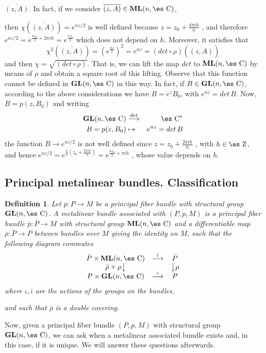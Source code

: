 \documentclass[12pt]{article}
\theoremstyle{plain}
\newtheorem{definition}{Definition}
\def\beann{\begin{eqnarray*}}
\def\eeann{\end{eqnarray*}}
\def\dst{\(}
\def\mapping#1{\mathrel{\mathop{\longrightarrow}\limits^{#1}}}
\def\GL{{\bf GL}(n,\Complex )}
\def\ML{{\bf ML}(n,\Complex )}
\def\Zahl{\mbox{\es Z}}
\def\Complex{\mbox{\es C}}
\begin{document}
$\overline{(z,A)}$.  In fact, if we consider $\overline{(z,A)} \in \ML$,

then $\chi(\overline{(z,A)}) = e^{nz/2}$ is well defined because
\dst z=z_0+\frac{4\pi i h}{n}\) , and therefore
\dst e^{nz/2}=e^{\frac{nz_0}{2}+2\pi i h}=e^{\frac{nz_0}{2}}\)
which does not depend on $h$. Moreover, it satisfies that
$$
\chi^2(\overline{(z,A)}) = (e^{\frac{nz}{2}})^2 = e^{nz} = (det \circ
\rho )(\overline{(z,A)})
$$
and then $\chi = \sqrt{(det \circ \rho )}$.
That is, we can lift the map $det$ to $\ML$ by means of $\rho$ and
obtain a square root of this lifting. Observe that this function cannot
be defined
in $\GL$ in this way. In fact, if $B \in \GL$, according to the above
considerations we have
$B=e^{z} B_0$, with $e^{nz}=det\, B$. Now, $B=p(z,B_0)$ and writing
\beann
\GL &\mapping{det}& \Complex^*
\\
B=p(z,B_0) &\mapsto& e^{nz}=det\, B
\eeann
the function $B \to e^{nz/2}$ is not well defined since
\dst z=z_0+\frac{2\pi i h}{n}\) , with $h\in \Zahl$, and hence
\dst e^{nz/2} =e^{\frac{n}{2}(z_0+\frac{2\pi i h}{n})} =
e^{\frac{nz_0}{2}+\pi i h}\) ,
whose value depends on $h$.



\subsection{Principal metalinear bundles. Classification}


\begin{definition}
Let $p : P \to M$ be a principal fiber bundle with structural group
$\GL$.
A {\rm metalinear bundle associated with} $(P,p,M)$
is a principal fiber bundle $\bar p : \bar P \to M$
 with structural group $\ML$ and a differentiable map
 $\bar \rho : \bar P\to P$
between bundles over $M$ giving the identity on $M$,
such that the following diagram commutes
$$
\begin{array}{ccc}
\bar P \times \ML & \mapping{\bar \iota} & \bar P
\\
\bar \rho \times \rho \big\downarrow & & \big\downarrow \rho
\\
P \times \GL & \mapping{\iota} & P
\end{array}
$$
where $\iota , \bar \iota$ are the actions of the groups on the bundles,

and such that $\bar \rho$ is a double covering.
\label{amfb}
\end{definition}

Now, given a principal fiber bundle $(P,p,M)$ with structural group
$\GL$,
we can ask when a metalinear associated bundle exists and,
in this case, if it is unique. We will answer these questions
afterwards.
\end{document}
